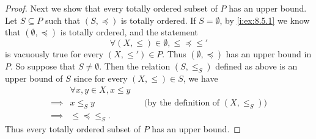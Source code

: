 \begin{proof}
  Next we show that every totally ordered subset of \(P\) has an upper bound.
  Let \(S \subseteq P\) such that \((S, \preceq)\) is totally ordered.
  If \(S = \emptyset\), by \cref{i:ex:8.5.1} we know that \((\emptyset, \preceq)\) is totally ordered, and the statement
  \[
    \forall (X, \leq) \in \emptyset, \leq \preceq \leq'
  \]
  is vacuously true for every \((X, \leq') \in P\).
  Thus \((\emptyset, \preceq)\) has an upper bound in \(P\).
  So suppose that \(S \neq \emptyset\).
  Then the relation \((S, \leq_S)\) defined as above is an upper bound of \(S\) since for every \((X, \leq) \in S\), we have
  \begin{align*}
             & \forall x, y \in X, x \leq y                                                    \\
    \implies & x \leq_S y                   &  & \text{(by the definition of \((X, \leq_S)\))} \\
    \implies & \leq \preceq \leq_S.
  \end{align*}
  Thus every totally ordered subset of \(P\) has an upper bound.


\end{proof}
